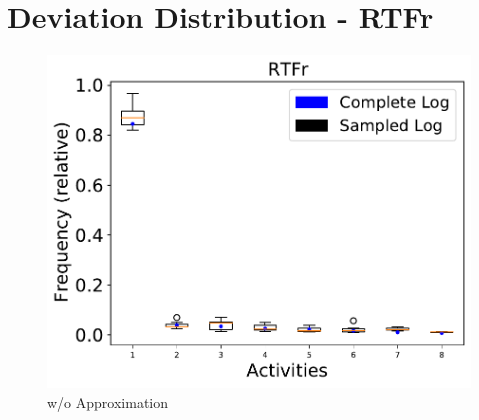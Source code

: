 \documentclass[landscape]{article}
\begin{document}
\section*{Deviation Distribution - RTFr}
\begin{figure}[!htb]
	\centering
	\begin{minipage}{0.2\textwidth}
		\includegraphics[width=1.0\textwidth]{../RTFM_model2/RTFM_model2_deviations.pdf}
		\caption{w/o Approximation}
	\end{minipage}
\end{figure}
\end{document}
